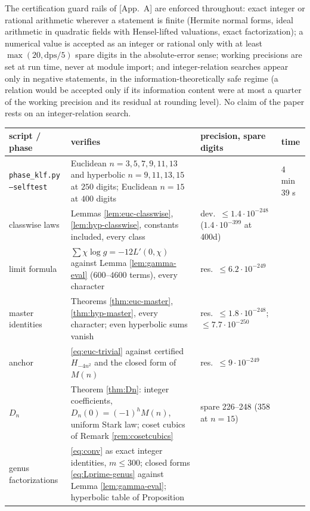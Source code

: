 \documentclass[11pt]{amsart}
\numberwithin{equation}{section}
\theoremstyle{plain}
\theoremstyle{definition}
\theoremstyle{remark}
\newcommand{\PaperI}{\cite{SchmidtI}}
\begin{document}
The certification guard rails of \PaperI[App.~A] are enforced
throughout: exact integer or rational arithmetic wherever a statement is
finite (Hermite normal forms, ideal arithmetic in quadratic fields with
Hensel-lifted valuations, exact factorization); a numerical value is
accepted as an integer or rational only with at least $\max(20,
\mathrm{dps}/5)$ spare digits in the absolute-error sense; working
precisions are set at run time, never at module import; and
integer-relation searches appear only in negative statements, in the
information-theoretically safe regime (a relation would be accepted only
if its information content were at most a quarter of the working
precision and its residual at rounding level).  No claim of the paper
rests on an integer-relation search.

\begin{center}
\footnotesize
\setlength{\tabcolsep}{3pt}
\renewcommand{\arraystretch}{0.94}
\begin{tabular}{@{}p{2.6cm}p{5.8cm}p{2.0cm}p{1.4cm}@{}}
\toprule
script / phase & verifies & precision, spare digits & time\\
\midrule
\texttt{phase\_klf.py --selftest} & Euclidean $n = 3, 5, 7, 9, 11, 13$
and hyperbolic $n = 9, 11, 13, 15$ at $250$ digits; Euclidean $n = 15$
at $400$ digits & & 4 min 39 s\\
\quad classwise laws & Lemmas \ref{lem:euc-classwise},
\ref{lem:hyp-classwise}, constants included, every class & dev.\
$\le 1.4\cdot10^{-248}$ ($1.4\cdot10^{-399}$ at 400d) & \\
\quad limit formula & $\sum\chi\log g = -12L'(0,\chi)$ against Lemma
\ref{lem:gamma-eval} ($600$--$4600$ terms), every character &
res.\ $\le 6.2\cdot10^{-249}$ & \\
\quad master identities & Theorems \ref{thm:euc-master},
\ref{thm:hyp-master}, every character; even hyperbolic sums vanish &
res.\ $\le 1.8\cdot10^{-248}$; $\le 7.7\cdot10^{-250}$ & \\
\quad anchor & \eqref{eq:euc-trivial} against certified $H_{-4n^2}$ and
the closed form of $M(n)$ & res.\ $\le 9\cdot10^{-249}$ & \\
\quad $D_n$ & Theorem \ref{thm:Dn}: integer coefficients, $D_n(0) =
(-1)^hM(n)$, uniform Stark law; coset cubics of Remark
\ref{rem:cosetcubics} & spare 226--248 (358 at $n = 15$) & \\
\quad genus factorizations & \eqref{eq:conv} as exact integer identities,
$m \le 300$; closed forms \eqref{eq:Lprime-genus} against Lemma
\ref{lem:gamma-eval}; hyperbolic table of Proposition

\end{tabular}
\end{center}
\end{document}
